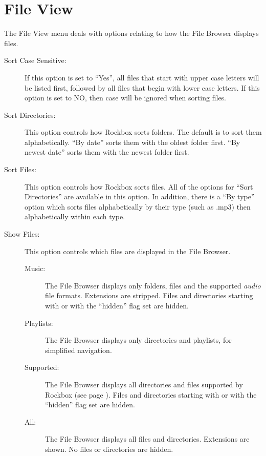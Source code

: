\section{File View}
  The File View menu deals with options relating to how the File Browser 
  displays files.
  \begin{description}
  \item[Sort Case Sensitive:]
    If this option is set to ``Yes'', all files that start with upper case 
    letters will be listed first, followed by all files that begin with lower 
    case letters.  If this option is set to NO, then case will be ignored when 
    sorting files.
  \item[Sort Directories:]
    This option controls how Rockbox sorts folders.  The default is to sort 
    them alphabetically. ``By date'' sorts them with the oldest folder first. 
    ``By newest date'' sorts them with the newest folder first.
    
  \item[Sort Files:]
    This option controls how Rockbox sorts files.  All of the options for 
    ``Sort Directories'' are available in this option.  In addition, there 
    is a ``By type'' option which sorts files alphabetically by their type 
    (such as .mp3) then alphabetically within each type.
    
  \item[\label{ref:ShowFiles}Show Files:]
    This option controls which files are displayed in the File Browser.
    \begin{description}
    \item[Music:] The File Browser displays only folders,  files 
      and the supported \emph{audio} file formats.  Extensions are stripped.  
      Files and directories starting with  or with the ``hidden'' 
      flag set are hidden.
    \item[Playlists:] The File Browser displays only directories and playlists,
      for simplified navigation.
    \item[Supported:] The File Browser displays all directories and files 
      supported by Rockbox (see page \pageref{ref:Supportedfileformats}).  
      Files and directories starting with  or with the ``hidden'' 
      flag set are hidden.
    \item[All:] The File Browser displays all files and directories. 
      Extensions are shown. No files or directories are hidden.
    \end{description}
    

\end{description}
